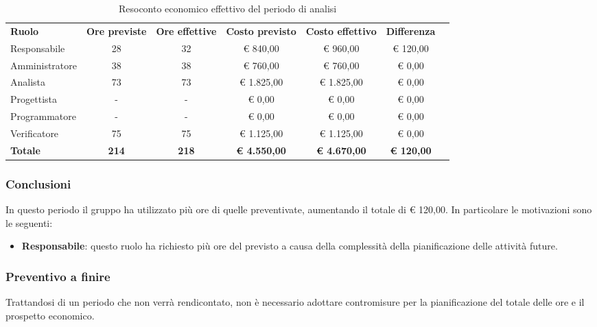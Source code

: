 \documentclass[../piano-di-progetto.tex]{subfiles}
\begin{document}
  \begin{table}[H]
    \centering
    \begin{tabular}{lcccccc}
      \rowcolor{lightgray}
      \textbf{Ruolo}  & \textbf{Ore previste} & \textbf{Ore effettive} & \textbf{Costo previsto} & \textbf{Costo effettivo} & \textbf{Differenza} \\
      Responsabile    & 28                    & 32                     & € 840,00                & € 960,00                 & € 120,00    \\
      Amministratore  & 38                    & 38                     & € 760,00                & € 760,00                 & € 0,00     \\
      Analista        & 73                    & 73                     & € 1.825,00              & € 1.825,00               & € 0,00   \\
      Progettista     & -                     & -                      & € 0,00                  & € 0,00                   & € 0,00     \\
      Programmatore   & -                     & -                      & € 0,00                  & € 0,00                   & € 0,00     \\
      Verificatore    & 75                    & 75                     & € 1.125,00              & € 1.125,00               & € 0,00     \\
      \textbf{Totale} & \textbf{214}          & \textbf{218}           & \textbf{€ 4.550,00}     & \textbf{€ 4.670,00}      & \textbf{€ 120,00}   
      
    \end{tabular}
    \caption{Resoconto economico effettivo del periodo di analisi}
  \end{table}


\subsubsection{Conclusioni}
In questo periodo il gruppo ha utilizzato più ore di quelle preventivate, aumentando il totale di € 120,00. In particolare le motivazioni sono le seguenti:
\begin{itemize}
    \item \textbf{Responsabile}: questo ruolo ha richiesto più ore del previsto a causa della complessità della pianificazione delle attività future.
    \end{itemize}

\subsubsection{Preventivo a finire}
Trattandosi di un periodo che non verrà rendicontato, non è necessario adottare contromisure per la pianificazione del totale delle ore e il prospetto economico.
\end{document}
